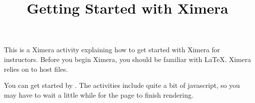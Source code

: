 \documentclass{ximera}
\title{Getting Started with Ximera}
\begin{document}
\maketitle

This is a Ximera activity explaining how to get started with Ximera for instructors. 
Before you begin Ximera, you should be familiar with \LaTeX.
Ximera relies on  to host files.

You can get started by . The activities include quite a bit of javascript, so you may have to wait a little while for the page to finish rendering.
\end{document}
